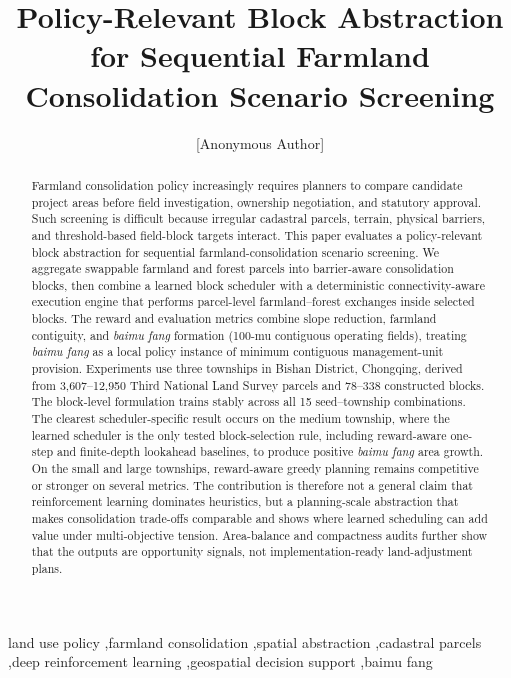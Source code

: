 \documentclass[preprint,12pt]{elsarticle}
\begin{document}
\begin{frontmatter}

\title{Policy-Relevant Block Abstraction for Sequential Farmland Consolidation Scenario Screening}

\author[anon]{[Anonymous Author]}


\begin{abstract}
Farmland consolidation policy increasingly requires planners to compare candidate project areas before field investigation, ownership negotiation, and statutory approval. Such screening is difficult because irregular cadastral parcels, terrain, physical barriers, and threshold-based field-block targets interact. This paper evaluates a policy-relevant block abstraction for sequential farmland-consolidation scenario screening. We aggregate swappable farmland and forest parcels into barrier-aware consolidation blocks, then combine a learned block scheduler with a deterministic connectivity-aware execution engine that performs parcel-level farmland--forest exchanges inside selected blocks. The reward and evaluation metrics combine slope reduction, farmland contiguity, and \textit{baimu fang} formation (100-mu contiguous operating fields), treating \textit{baimu fang} as a local policy instance of minimum contiguous management-unit provision. Experiments use three townships in Bishan District, Chongqing, derived from 3,607--12,950 Third National Land Survey parcels and 78--338 constructed blocks. The block-level formulation trains stably across all 15 seed--township combinations. The clearest scheduler-specific result occurs on the medium township, where the learned scheduler is the only tested block-selection rule, including reward-aware one-step and finite-depth lookahead baselines, to produce positive \textit{baimu fang} area growth. On the small and large townships, reward-aware greedy planning remains competitive or stronger on several metrics. The contribution is therefore not a general claim that reinforcement learning dominates heuristics, but a planning-scale abstraction that makes consolidation trade-offs comparable and shows where learned scheduling can add value under multi-objective tension. Area-balance and compactness audits further show that the outputs are opportunity signals, not implementation-ready land-adjustment plans.
\end{abstract}

\begin{keyword}
land use policy \sep farmland consolidation \sep spatial abstraction \sep cadastral parcels \sep deep reinforcement learning \sep geospatial decision support \sep baimu fang
\end{keyword}

\end{frontmatter}
\end{document}
